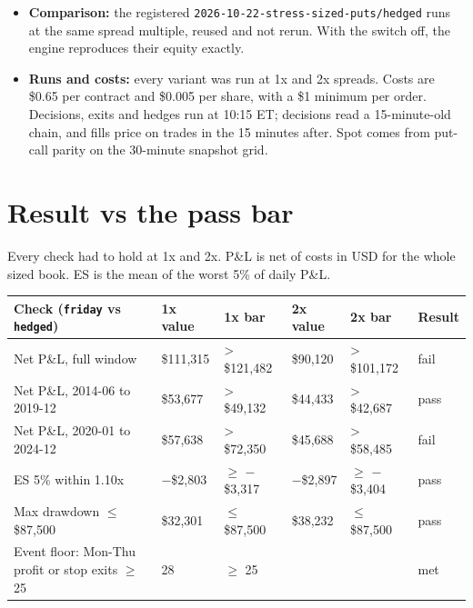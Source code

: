 \documentclass{article}
\begin{document}
\begin{itemize}
\begin{itemize}
\item \texttt{tuesday\_\allowbreak{}roll} (sensitivity): \texttt{[exit] exit\_\allowbreak{}dte = 3}. The expiring put is held through the weekend and rolled on the Tuesday of expiry week.

\end{itemize}

\item \textbf{Comparison:} the registered \texttt{2026-\allowbreak{}10-\allowbreak{}22-\allowbreak{}stress-\allowbreak{}sized-\allowbreak{}puts/\allowbreak{}hedged} runs at the same spread multiple, reused and not rerun. With the switch off, the engine reproduces their equity exactly.

\item \textbf{Runs and costs:} every variant was run at 1x and 2x spreads. Costs are \$0.65 per contract and \$0.005 per share, with a \$1 minimum per order. Decisions, exits and hedges run at 10:15 ET; decisions read a 15-minute-old chain, and fills price on trades in the 15 minutes after. Spot comes from put-call parity on the 30-minute snapshot grid.

\end{itemize}

\section{Result vs the pass bar}

Every check had to hold at 1x and 2x. P\&L is net of costs in USD for the whole sized book. ES is the mean of the worst 5\% of daily P\&L.

\begin{center}\small
\begin{tabularx}{\linewidth}{>{\raggedright\arraybackslash}X l l l l l}
\toprule
\textbf{Check (\texttt{friday} vs \texttt{hedged})} & \textbf{1x value} & \textbf{1x bar} & \textbf{2x value} & \textbf{2x bar} & \textbf{Result} \\
\midrule
Net P\&L, full window & \$111,315 & > \$121,482 & \$90,120 & > \$101,172 & fail \\
Net P\&L, 2014-06 to 2019-12 & \$53,677 & > \$49,132 & \$44,433 & > \$42,687 & pass \\
Net P\&L, 2020-01 to 2024-12 & \$57,638 & > \$72,350 & \$45,688 & > \$58,485 & fail \\
ES 5\% within 1.10x & \ensuremath{-}\$2,803 & \ensuremath{\geq} \ensuremath{-}\$3,317 & \ensuremath{-}\$2,897 & \ensuremath{\geq} \ensuremath{-}\$3,404 & pass \\
Max drawdown \ensuremath{\leq} \$87,500 & \$32,301 & \ensuremath{\leq} \$87,500 & \$38,232 & \ensuremath{\leq} \$87,500 & pass \\
Event floor: Mon-Thu profit or stop exits \ensuremath{\geq} 25 & 28 & \ensuremath{\geq} 25 &  &  & met \\
\bottomrule
\end{tabularx}
\end{center}
\end{document}
